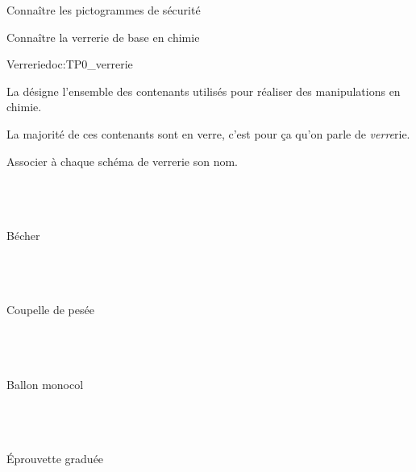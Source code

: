 \teteSndMeth

\vspace*{-36pt}


\begin{objectifs}
  \item Connaître les pictogrammes de sécurité
  \item Connaître la verrerie de base en chimie
\end{objectifs}




\begin{doc}{Verrerie}{doc:TP0_verrerie}
  \begin{importants}
    La  désigne l'ensemble des contenants utilisés pour réaliser des manipulations en chimie.
  \end{importants}
  La majorité de ces contenants sont en verre, c'est pour ça qu'on parle de \textit{verre}rie.
\end{doc}


\numeroQuestion Associer à chaque schéma de verrerie son nom.

\begin{multicols}{4}
  \centering
   \\[-18pt]
  \pointCyan \\[3cm]
  \pointCyan \\ Bécher

   \\[-18pt]
  \pointCyan \\[3cm]
  \pointCyan \\ Coupelle de pesée
  
   \\[-18pt]
  \pointCyan \\[3cm]
  \pointCyan \\ Ballon monocol
  
   \\[-18pt]
  \pointCyan \\[3cm]
  \pointCyan \\ Éprouvette graduée
\end{multicols}
\vspace*{1cm}

